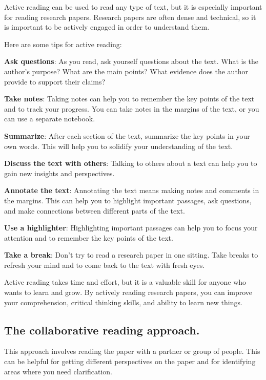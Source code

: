 \documentclass[
  b5paper]{book}
\begin{document}
Active reading can be used to read any type of text, but it is especially important for reading research papers. Research papers are often dense and technical, so it is important to be actively engaged in order to understand them.

Here are some tips for active reading:

\textbf{Ask questions}: As you read, ask yourself questions about the text. What is the author's purpose? What are the main points? What evidence does the author provide to support their claims?

\textbf{Take notes}: Taking notes can help you to remember the key points of the text and to track your progress. You can take notes in the margins of the text, or you can use a separate notebook.

\textbf{Summarize}: After each section of the text, summarize the key points in your own words. This will help you to solidify your understanding of the text.

\textbf{Discuss the text with others}: Talking to others about a text can help you to gain new insights and perspectives.

\textbf{Annotate the text}: Annotating the text means making notes and comments in the margins. This can help you to highlight important passages, ask questions, and make connections between different parts of the text.

\textbf{Use a highlighter}: Highlighting important passages can help you to focus your attention and to remember the key points of the text.

\textbf{Take a break}: Don't try to read a research paper in one sitting. Take breaks to refresh your mind and to come back to the text with fresh eyes.

Active reading takes time and effort, but it is a valuable skill for anyone who wants to learn and grow. By actively reading research papers, you can improve your comprehension, critical thinking skills, and ability to learn new things.

\hypertarget{the-collaborative-reading-approach.}{%
\subsection*{The collaborative reading approach.}\label{the-collaborative-reading-approach.}}

This approach involves reading the paper with a partner or group of people. This can be helpful for getting different perspectives on the paper and for identifying areas where you need clarification.
\end{document}
